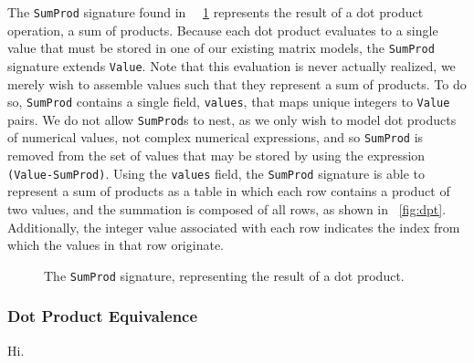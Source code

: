 \documentclass[sigconf]{acmart}
\begin{document}
The \texttt{SumProd} signature found in ~\figurename~\ref{alloy:sumprod} represents the result of a dot product operation, a sum of products.  Because each dot product evaluates to a single value that must be stored in one of our existing matrix models, the \texttt{SumProd} signature extends \texttt{Value}.  Note that this evaluation is never actually realized, we merely wish to assemble values such that they represent a sum of products.  To do so, \texttt{SumProd} contains a single field, \texttt{values}, that maps unique integers to \texttt{Value} pairs.  We do not allow \texttt{SumProd}s to nest, as we only wish to model dot products of numerical values, not complex numerical expressions, and so \texttt{SumProd} is removed from the set of values that may be stored by using the expression \texttt{(Value-SumProd)}.  Using the \texttt{values} field, the \texttt{SumProd} signature is able to represent a sum of products as a table in which each row contains a product of two values, and the summation is composed of all rows, as shown in \figurename~\ref{fig:dpt}.  Additionally, the integer value associated with each row indicates the index from which the values in that row originate.

\begin{figure}

\caption{The \texttt{SumProd} signature, representing the result of a dot product.}
\label{alloy:sumprod}
\end{figure}

\subsubsection{Dot Product Equivalence}
\label{sec:valeqv}

Hi.


\end{document}
